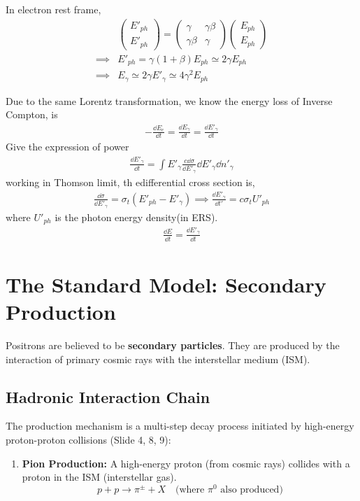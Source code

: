 \documentclass{sciposter}
\begin{document}
\begin{multicols}{3}
In electron rest frame,
\begin{align}
    &\begin{pmatrix}
    E'_{ph} \\
    E'_{ph} 
    \end{pmatrix}=\begin{pmatrix}
    \gamma &\gamma \beta \\
    \gamma \beta &\gamma 
    \end{pmatrix}\begin{pmatrix}
    E_{ph} \\
    E_{ph} 
    \end{pmatrix}\\
    \implies &E'_{ph}=\gamma(1+\beta)E_{ph}\simeq 2\gamma E_{ph}   \\
    \implies&E_{\gamma} \simeq 2 \gamma E'_{\gamma}\simeq 4 \gamma ^{2}E_{ph}    
\end{align}

Due to the same Lorentz transformation, we know the energy loss of Inverse Compton, is 
\begin{align}
    -\frac{\dd{E_{e} }}{\dd{t}}=\frac{\dd{E_{\gamma} }}{\dd{t}}=\frac{\dd{E'_{\gamma} }}{\dd{t}}
\end{align}
Give the expression of power 
\begin{align}
    \frac{\dd{E'_{\gamma} }}{\dd{t}}=\int E'_{\gamma}\frac{c\dd{\sigma}}{\dd{E'_{\gamma} }}\dd{E'_{\gamma} }\dd{n'_{\gamma} }
\end{align}
working in Thomson limit, th edifferential cross section is,
\begin{align}
    \frac{\dd{\sigma}}{\dd{E'_{\gamma} }}=\sigma_{t}(E'_{ph}-E'_{\gamma}  )\implies \frac{\dd{E'_{\gamma} }}{\dd{t'}}=c\sigma_{t}U'_{ph}   
\end{align}
where $U'_{ph} $ is the photon energy density(in ERS).
\begin{align}
    \frac{\dd{E}}{\dd{t}}=\frac{\dd{E'_{\gamma} }}{\dd{t}}
\end{align}

\section{The Standard Model: Secondary Production}
Positrons are believed to be \textbf{secondary particles}. They are produced by the interaction of primary cosmic rays with the interstellar medium (ISM).

\subsection{Hadronic Interaction Chain}
The production mechanism is a multi-step decay process initiated by high-energy proton-proton collisions (Slide 4, 8, 9):
\begin{enumerate}
    \item \textbf{Pion Production:} A high-energy proton (from cosmic rays) collides with a proton in the ISM (interstellar gas).
    $$ p + p \rightarrow \pi^{\pm} + X \quad (\text{where } \pi^0 \text{ also produced)} $$
    

\end{enumerate}
\end{multicols}
\end{document}
